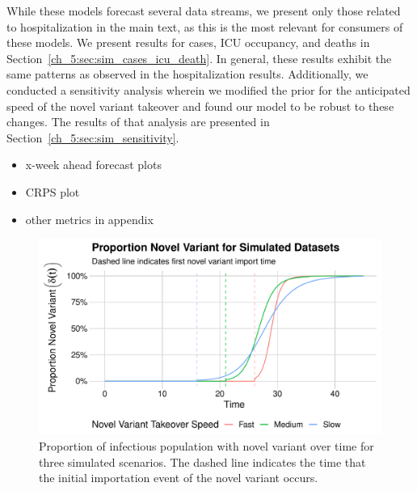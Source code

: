 While these models forecast several data streams, we present only those related to hospitalization in the main text, as this is the most relevant for consumers of these models.
We present results for cases, ICU occupancy, and deaths in Section~\ref{ch_5:sec:sim_cases_icu_death}.
In general, these results exhibit the same patterns as observed in the hospitalization results.
Additionally, we conducted a sensitivity analysis wherein we modified the prior for the anticipated speed of the novel variant takeover and found our model to be robust to these changes.
The results of that analysis are presented in Section~\ref{ch_5:sec:sim_sensitivity}.


\begin{itemize}
    \item x-week ahead forecast plots
    \item CRPS plot
    \item other metrics in appendix
\end{itemize}

\begin{figure}
    \centering
    \includegraphics[width=1.0\columnwidth]{proportion_novel_variant_simulated_data_plot}
    \caption{Proportion of infectious population with novel variant over time for three simulated scenarios.
    The dashed line indicates the time that the initial importation event of the novel variant occurs.}
    \label{ch_5:fig:proportion_novel_variant_simulated_data_plot}
\end{figure}

